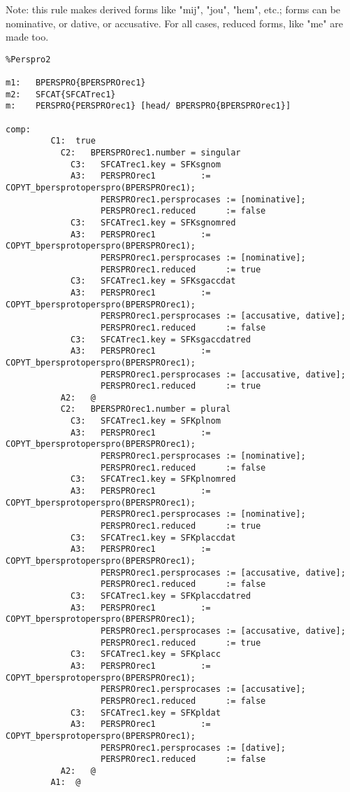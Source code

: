 Note: this rule makes derived forms like "mij", "jou", "hem", etc.; forms can
      be nominative, or dative, or accusative. For all cases, reduced forms, 
      like "me" are made too.
\begin{verbatim}
%Perspro2

m1:   BPERSPRO{BPERSPROrec1}
m2:   SFCAT{SFCATrec1}
m:    PERSPRO{PERSPROrec1} [head/ BPERSPRO{BPERSPROrec1}]

comp:    
         C1:  true
           C2:   BPERSPROrec1.number = singular
             C3:   SFCATrec1.key = SFKsgnom
             A3:   PERSPROrec1         := COPYT_bpersprotoperspro(BPERSPROrec1);
                   PERSPROrec1.persprocases := [nominative];
                   PERSPROrec1.reduced      := false
             C3:   SFCATrec1.key = SFKsgnomred
             A3:   PERSPROrec1         := COPYT_bpersprotoperspro(BPERSPROrec1);
                   PERSPROrec1.persprocases := [nominative];
                   PERSPROrec1.reduced      := true
             C3:   SFCATrec1.key = SFKsgaccdat
             A3:   PERSPROrec1         := COPYT_bpersprotoperspro(BPERSPROrec1);
                   PERSPROrec1.persprocases := [accusative, dative];
                   PERSPROrec1.reduced      := false
             C3:   SFCATrec1.key = SFKsgaccdatred
             A3:   PERSPROrec1         := COPYT_bpersprotoperspro(BPERSPROrec1);
                   PERSPROrec1.persprocases := [accusative, dative];
                   PERSPROrec1.reduced      := true
           A2:   @
           C2:   BPERSPROrec1.number = plural
             C3:   SFCATrec1.key = SFKplnom
             A3:   PERSPROrec1         := COPYT_bpersprotoperspro(BPERSPROrec1);
                   PERSPROrec1.persprocases := [nominative];
                   PERSPROrec1.reduced      := false
             C3:   SFCATrec1.key = SFKplnomred
             A3:   PERSPROrec1         := COPYT_bpersprotoperspro(BPERSPROrec1);
                   PERSPROrec1.persprocases := [nominative];
                   PERSPROrec1.reduced      := true
             C3:   SFCATrec1.key = SFKplaccdat
             A3:   PERSPROrec1         := COPYT_bpersprotoperspro(BPERSPROrec1);
                   PERSPROrec1.persprocases := [accusative, dative];
                   PERSPROrec1.reduced      := false
             C3:   SFCATrec1.key = SFKplaccdatred
             A3:   PERSPROrec1         := COPYT_bpersprotoperspro(BPERSPROrec1);
                   PERSPROrec1.persprocases := [accusative, dative];
                   PERSPROrec1.reduced      := true
             C3:   SFCATrec1.key = SFKplacc
             A3:   PERSPROrec1         := COPYT_bpersprotoperspro(BPERSPROrec1);
                   PERSPROrec1.persprocases := [accusative];
                   PERSPROrec1.reduced      := false
             C3:   SFCATrec1.key = SFKpldat
             A3:   PERSPROrec1         := COPYT_bpersprotoperspro(BPERSPROrec1);
                   PERSPROrec1.persprocases := [dative];
                   PERSPROrec1.reduced      := false
           A2:   @
         A1:  @



\end{verbatim}
